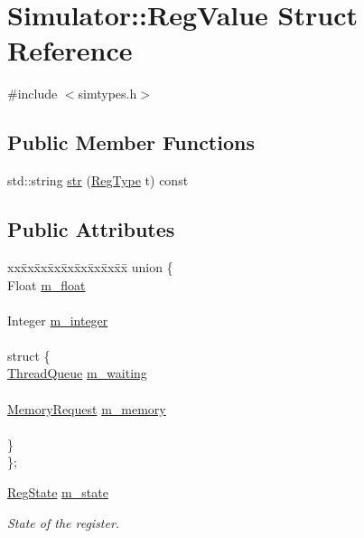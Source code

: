 \hypertarget{struct_simulator_1_1_reg_value}{\section{Simulator\+:\+:Reg\+Value Struct Reference}
\label{struct_simulator_1_1_reg_value}
}


{\ttfamily \#include $<$simtypes.\+h$>$}

\subsection*{Public Member Functions}
\begin{DoxyCompactItemize}
\item 
std\+::string \hyperlink{struct_simulator_1_1_reg_value_a6f20e44fb7e3689060d0a2c15a333576}{str} (\hyperlink{namespace_simulator_ab86b74f4b95732ea63178d829b189acb}{Reg\+Type} t) const 
\end{DoxyCompactItemize}
\subsection*{Public Attributes}
\begin{DoxyCompactItemize}
\item 
\begin{tabbing}
xx\=xx\=xx\=xx\=xx\=xx\=xx\=xx\=xx\=\kill
union \{\\
\>Float \hyperlink{struct_simulator_1_1_reg_value_a99faac8cd5c6234b8ad94aace23fe6be}{m\_float}\\
\>\\
\>Integer \hyperlink{struct_simulator_1_1_reg_value_ac0d7c8afa67f0063f58c44c41120c712}{m\_integer}\\
\>\\
\>struct \{\\
\>\>\hyperlink{struct_simulator_1_1_thread_queue}{ThreadQueue} \hyperlink{struct_simulator_1_1_reg_value_a91b3b5d8a1bba0c86d960188275fb190}{m\_waiting}\\
\>\>\\
\>\>\hyperlink{struct_simulator_1_1_memory_request}{MemoryRequest} \hyperlink{struct_simulator_1_1_reg_value_ab612245b6f5c7b10e781068e30f2550b}{m\_memory}\\
\>\>\\
\>\} \\
\}; \\

\end{tabbing}\item 
\hyperlink{namespace_simulator_a0400735ff32412cb8ce9506b81492c69}{Reg\+State} \hyperlink{struct_simulator_1_1_reg_value_af75bf158fb9f748049a782213309f18b}{m\+\_\+state}
\begin{DoxyCompactList}\small\item\em State of the register. \end{DoxyCompactList}\end{DoxyCompactItemize}


